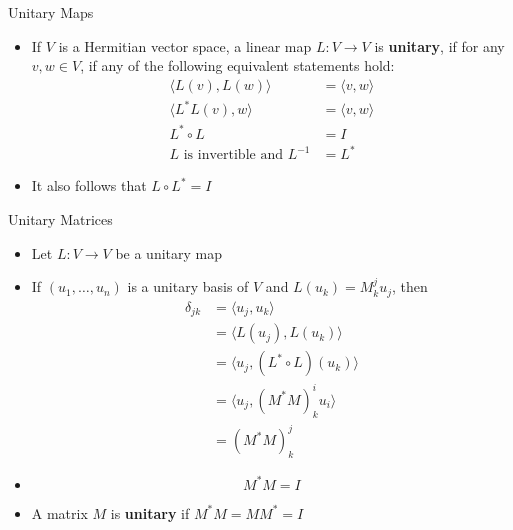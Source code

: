 \documentclass[usenames,dvipsnames,10pt]{beamer}
\begin{document}
\begin{frame}
  {Unitary Maps}

  \begin{itemize}
  \item If $V$ is a Hermitian vector space, a linear map $L: V \rightarrow V$ is {\bf unitary}, if for any $v, w \in V$, if any of the following equivalent statements hold:
    \begin{align*}
      \langle L(v), L(w)\rangle &= \langle v, w\rangle\\
      \langle L^*L(v), w\rangle &= \langle v, w\rangle\\
      L^*\circ L &= I\\
      L \text{ is invertible and }L^{-1} &= L^*
    \end{align*}
  \item It also follows that $L\circ L^* = I$
  \end{itemize}
\end{frame}

\begin{frame}
  {Unitary Matrices}

  \begin{itemize}
  \item Let $L: V \rightarrow V$ be a unitary map
  \item If $(u_1, \dots, u_n)$ is a unitary basis of $V$ and $L(u_k) = M_k^ju_j$, then
    \begin{align*}
      \delta_{jk} &= \langle u_j,u_k\rangle\\
                  &= \langle L(u_j),L(u_k)\rangle\\
                  &= \langle u_j, (L^*\circ L)(u_k)\rangle\\
                  &= \langle u_j, (M^*M)^i_ku_i\rangle\\
                  &= (M^*M)^j_k
    \end{align*}
  \item 
    \[
      M^*M = I
    \]
  \item A matrix $M$ is {\bf unitary} if $M^*M = MM^* = I$
  \end{itemize}
\end{frame}
\end{document}
